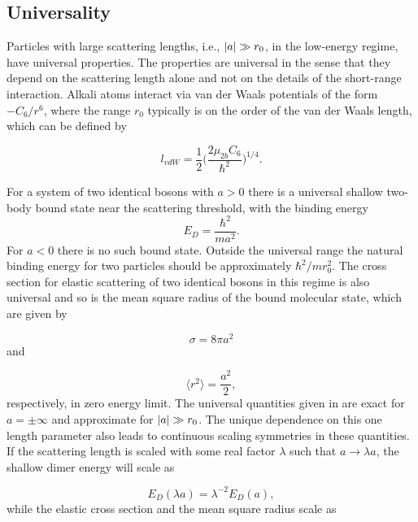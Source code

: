 \subsection{Universality}
Particles with large scattering lengths, i.e., $\lvert a\rvert\gg r_0$, in the low-energy regime, have universal properties. The properties are universal in the sense that they depend on the scattering length alone and not on the details of the short-range interaction. Alkali atoms interact via van der Waals potentials of the form $-C_6/r^6$, where the range $r_0$ typically is on the order of the van der Waals length, which can be defined by \cite{vanderWaals}

\begin{equation}
l_{vdW} = \frac{1}{2}\bigg(\frac{2\mu_{2b} C_6}{\hbar^2}\bigg)^{1/4}.
\end{equation}

For a system of two identical bosons with $a>0$ there is a universal shallow two-body bound state near the scattering threshold, with the binding energy 
\begin{equation}\label{shallowdimer}
E_D = \frac{\hbar^2}{m a^2}.
\end{equation}
For $a<0$ there is no such bound state. Outside the universal range the natural binding energy for two particles should be approximately $\hbar^2/mr_0^2$. The cross section for elastic scattering of two identical bosons in this regime is also universal and so is the mean square radius of the bound molecular state, which are given by

\begin{equation}\label{elasticcross}
\sigma = 8\pi a^2
\end{equation}
and

\begin{equation}\label{meanradius}
\langle r^2\rangle = \frac{a^2}{2},
\end{equation}
respectively, in zero energy limit. The universal quantities given in  are exact for $a=\pm \infty$ and approximate for $\lvert a\rvert\gg r_0$. The unique dependence on this one length parameter also leads to continuous scaling symmetries in these quantities. If the scattering length is scaled with some real factor $\lambda$ such that $a \to \lambda a$, the shallow dimer energy will scale as 

\begin{equation}
E_D(\lambda a) = \lambda^{-2}E_D(a),
\end{equation}    
while the elastic cross section and the mean square radius scale as 

